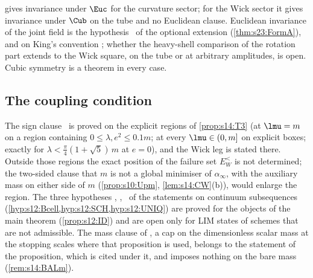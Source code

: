  gives invariance under $\Euc$ for the curvature sector; for the Wick sector it gives invariance under $\Cub$ on the tube and no Euclidean clause. Euclidean invariance of the joint field is the hypothesis \RW\ of the optional extension (\cref{thm:s23:FormA}), and on King's convention \FAK; whether the heavy-shell comparison of the rotation part extends to the Wick square, on the tube or at arbitrary amplitudes, is open. Cubic symmetry is a theorem in every case.

\subsection{The coupling condition}

The sign clause \Tthree\ is proved on the explicit regions of \cref{prop:s14:T3} (at $\lmu=m$ on a region containing $0\le\lambda,e^2\le0.1m$; at every $\lmu\in(0,m]$ on explicit boxes; exactly for $\lambda<\frac\pi4(1+\sqrt5)\,m$ at $e=0$), and the Wick leg is stated there. Outside those regions the exact position of the failure set $E^<_W$ is not determined; the two-sided clause that $m$ is not a global minimiser of $\alpha_\infty$, with the auxiliary mass on either side of $m$ (\cref{prop:s10:Upm}, \cref{lem:s14:CW}(b)), would enlarge the region. The three hypotheses \Bcell, \SCH, \UNIQ\ of the statements on continuum subsequences (\cref{hyp:s12:Bcell,hyp:s12:SCH,hyp:s12:UNIQ}) are proved for the objects of the main theorem (\cref{prop:s12:ID}) and are open only for LIM states of schemes that are not admissible. The mass clause of \cite[Prop.~3.1]{Ba2}, a cap on the dimensionless scalar mass at the stopping scales where that proposition is used, belongs to the statement of the proposition, which is cited under it, and imposes nothing on the bare mass (\cref{rem:s14:BALm}).
